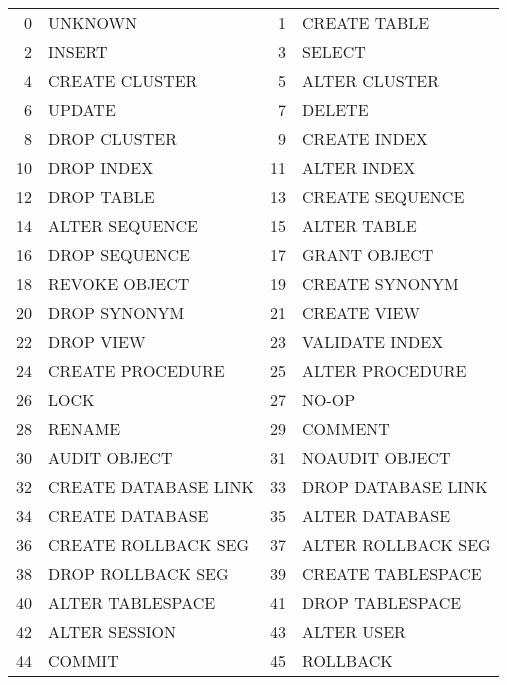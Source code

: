 \begin{appendix}
\begin{longtable}[]{@{}rl|rl@{}}
0   & UNKNOWN                      & 1   & CREATE TABLE                 \\
2   & INSERT                       & 3   & SELECT                       \\
4   & CREATE CLUSTER               & 5   & ALTER CLUSTER                \\
6   & UPDATE                       & 7   & DELETE                       \\
8   & DROP CLUSTER                 & 9   & CREATE INDEX                 \\
10  & DROP INDEX                   & 11  & ALTER INDEX                  \\
12  & DROP TABLE                   & 13  & CREATE SEQUENCE              \\
14  & ALTER SEQUENCE               & 15  & ALTER TABLE                  \\
16  & DROP SEQUENCE                & 17  & GRANT OBJECT                 \\
18  & REVOKE OBJECT                & 19  & CREATE SYNONYM               \\
20  & DROP SYNONYM                 & 21  & CREATE VIEW                  \\
22  & DROP VIEW                    & 23  & VALIDATE INDEX               \\
24  & CREATE PROCEDURE             & 25  & ALTER PROCEDURE              \\
26  & LOCK                         & 27  & NO-OP                        \\
28  & RENAME                       & 29  & COMMENT                      \\
30  & AUDIT OBJECT                 & 31  & NOAUDIT OBJECT               \\
32  & CREATE DATABASE LINK         & 33  & DROP DATABASE LINK           \\
34  & CREATE DATABASE              & 35  & ALTER DATABASE               \\
36  & CREATE ROLLBACK SEG          & 37  & ALTER ROLLBACK SEG           \\
38  & DROP ROLLBACK SEG            & 39  & CREATE TABLESPACE            \\
40  & ALTER TABLESPACE             & 41  & DROP TABLESPACE              \\
42  & ALTER SESSION                & 43  & ALTER USER                   \\
44  & COMMIT                       & 45  & ROLLBACK                     \\

\end{longtable}
\end{appendix}

